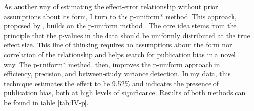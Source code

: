 \begin{singlespace}
\begin{footnotesize}
\end{footnotesize}
\end{singlespace}

As another way of estimating the effect-error relationship without prior assumptions about its form, I turn to the p-uniform* method. This approach, proposed by \cite{vanAert2021puni}, builds on the p-uniform method \citep{van2016conducting}. The core idea stems from the principle that the p-values in the data should be uniformly distributed at the true effect size. This line of thinking requires no assumptions about the form nor correlation of the relationship and helps search for publication bias in a novel way. The p-uniform* method, then, improves the p-uniform approach in efficiency, precision, and between-study variance detection. In my data, this technique estimates the effect to be 9.52\% and indicates the presence of publication bias, both at high levels of significance. Results of both methods can be found in table \autoref{tab:IV-p}. 

